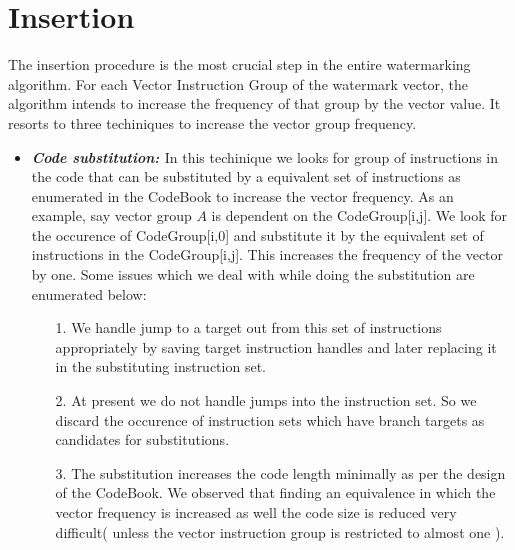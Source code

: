 \section{Insertion } The insertion procedure is the most crucial step in
the entire watermarking algorithm. For each Vector Instruction Group of the
watermark vector, the algorithm intends to increase the frequency of that group
by the vector value. It resorts to three techiniques to increase the vector 
group frequency.
\begin{itemize}
   \item {\bf {\em Code substitution: }}  In this techinique we looks for group of 
         instructions in the code that can be substituted by a equivalent set of
	 instructions as enumerated in the CodeBook to increase the vector 
	 frequency. As an example, say vector group $A$ is dependent on the 
	 CodeGroup[i,j]. We look for the occurence of CodeGroup[i,0] and 
	 substitute it by the equivalent set of instructions in the 
	 CodeGroup[i,j]. This increases the frequency of the vector by one. Some
	 issues which we deal with while doing the substitution are enumerated 
	 below:
	 \begin{itemize}
	 \item [1.] We handle jump to a target out from this set of instructions
	       appropriately by saving target instruction handles and later
	       replacing it in the substituting instruction set. 
         \item [2.] At present we do not handle jumps into the instruction set.
	       So we discard the occurence of instruction sets which have 
	       branch targets as candidates for substitutions.
         \item [3.] The substitution increases the code length minimally as per
	       the design of the CodeBook. We observed that finding an 
	       equivalence in which the vector frequency is increased as well 
	       the code size is reduced very difficult( unless the vector 
	       instruction group is restricted to almost one ).
	 \end{itemize}


\end{itemize}
